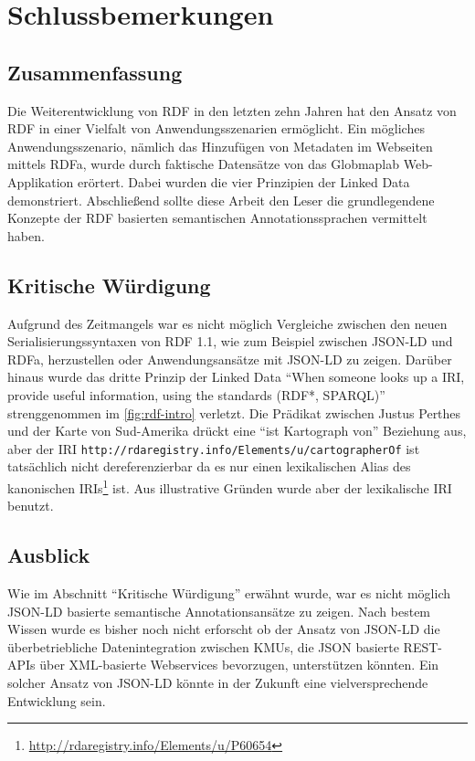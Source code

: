 \section{Schlussbemerkungen}
\subsection{Zusammenfassung}

Die Weiterentwicklung von RDF in den letzten zehn Jahren hat den Ansatz von RDF in einer Vielfalt von Anwendungsszenarien ermöglicht. Ein mögliches Anwendungsszenario, nämlich das Hinzufügen von Metadaten im Webseiten mittels RDFa, wurde durch faktische Datensätze von das Globmaplab Web-Applikation erörtert. Dabei wurden die vier Prinzipien der Linked Data demonstriert. Abschließend sollte diese Arbeit den Leser die grundlegendene Konzepte der RDF basierten semantischen Annotationssprachen vermittelt haben.

\subsection{Kritische Würdigung}
Aufgrund des Zeitmangels war es nicht möglich Vergleiche zwischen den neuen Serialisierungssyntaxen von RDF 1.1, wie zum Beispiel zwischen JSON-LD und RDFa, herzustellen oder Anwendungsansätze mit JSON-LD zu zeigen. Darüber hinaus wurde das dritte Prinzip der Linked Data \hyphenquote{german}{When someone looks up a IRI, provide useful information, using the standards (RDF*, SPARQL)} strenggenommen im \autoref{fig:rdf-intro} verletzt. Die Prädikat zwischen Justus Perthes und der Karte von Sud-Amerika drückt eine \hyphenquote{german}{ist Kartograph von} Beziehung aus, aber der IRI \texttt{http://rdaregistry.info/Elements/u/cartographerOf} ist tatsächlich nicht dereferenzierbar da es nur einen lexikalischen Alias des kanonischen IRIs\footnote{\url{http://rdaregistry.info/Elements/u/P60654}} ist. Aus illustrative Gründen wurde aber der lexikalische IRI benutzt. 

\subsection{Ausblick}
Wie im Abschnitt \hyphenquote{german}{Kritische Würdigung} erwähnt wurde, war es nicht möglich JSON-LD basierte semantische Annotationsansätze zu zeigen. Nach bestem Wissen wurde es bisher noch nicht erforscht ob der Ansatz von JSON-LD die überbetriebliche Datenintegration zwischen KMUs, die JSON basierte REST-APIs über XML-basierte Webservices bevorzugen, unterstützen könnten\footnotemark{}. Ein solcher Ansatz von JSON-LD könnte in der Zukunft eine vielversprechende Entwicklung sein.
